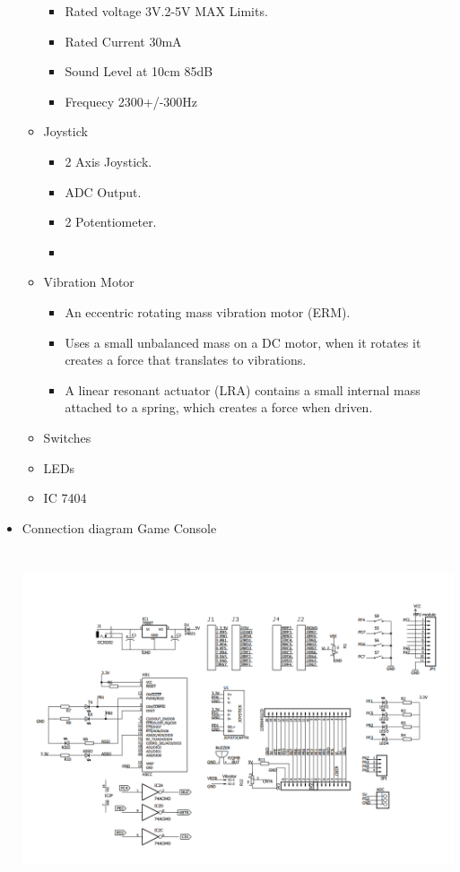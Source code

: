 \documentclass[a4paper,12pt,oneside]{book}
\begin{document}
\begin{itemize}
\begin{itemize}
    \begin{itemize}
      \item Rated voltage 3V.2-5V MAX Limits.
      \item Rated Current 30mA
      \item Sound Level at 10cm 85dB
      \item Frequecy 2300+/-300Hz
    \end{itemize}
    \item Joystick
    \begin{itemize}
      \item 2 Axis Joystick.
      \item ADC Output.
      \item 2 Potentiometer.
      \item 
    \end{itemize}
    \item Vibration Motor 
    \begin{itemize}
      \item An eccentric rotating mass vibration motor (ERM).
      \item Uses a small unbalanced mass on a DC motor, when it rotates it creates a force that translates to vibrations.
      \item A linear resonant actuator (LRA) contains a small internal mass attached to a spring, which creates a force when driven.
    \end{itemize}
    \item Switches
    \item LEDs
    \item  IC 7404
  \end{itemize}
  \item Connection diagram
  Game Console
  \begin{center}
  \includegraphics[width=15cm, height=10cm]{MiscImages/GAMECONSOLE_SCHEMATIC.png}

\end{center}
\end{itemize}
\end{document}
